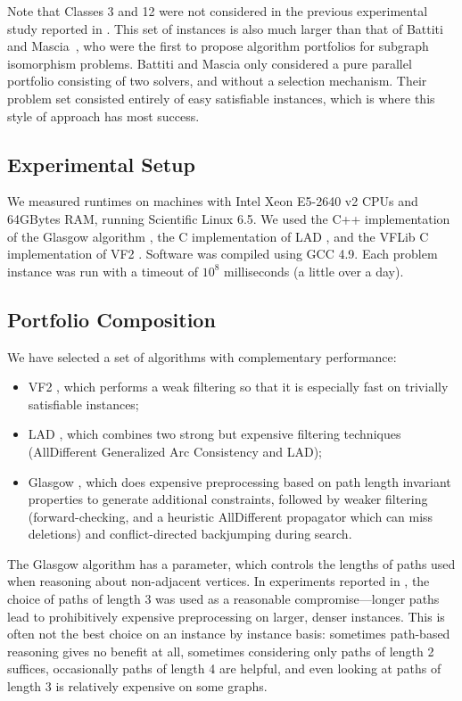 \documentclass{llncs}
\begin{document}
Note that Classes 3 and 12 were not considered in the previous experimental
study reported in \cite{McCreesh:2015}.  This set of instances is also much
larger than that of Battiti and Mascia~\cite{battiti-mascia07}, who were the
first to propose algorithm portfolios for subgraph isomorphism problems.
Battiti and Mascia only considered a pure parallel portfolio consisting of two
solvers, and without a selection mechanism. Their problem set consisted
entirely of easy satisfiable instances, which is where this style of approach
has most success.

\subsection{Experimental Setup}

We measured runtimes on machines with Intel Xeon E5-2640 v2 CPUs and 64GBytes RAM, running
Scientific Linux 6.5. We used the C++ implementation of the Glasgow algorithm \cite{McCreesh:2015},
the C implementation of LAD \cite{Solnon:2010}, and the VFLib C implementation of VF2
\cite{Cordella:2004}. Software was compiled using GCC 4.9. Each problem instance was run with a
timeout of $10^8$ milliseconds (a little over a day).

\subsection{Portfolio Composition}

We have selected a set of algorithms with complementary performance:
\begin{itemize}
\item VF2 \cite{Cordella:2004}, which performs a weak filtering so that it is especially fast on trivially satisfiable instances;
\item LAD \cite{Solnon:2010}, which combines two strong but expensive filtering techniques (AllDifferent Generalized Arc Consistency and LAD);
\item Glasgow \cite{McCreesh:2015}, which does expensive preprocessing based on path length
    invariant properties to generate additional constraints, followed by weaker filtering
    (forward-checking, and a heuristic AllDifferent propagator which can miss deletions) and
    conflict-directed backjumping during search.
\end{itemize}

\noindent The Glasgow algorithm has a parameter, which controls the lengths of paths used when
reasoning about non-adjacent vertices.  In experiments reported in \cite{McCreesh:2015}, the choice
of paths of length 3 was used as a reasonable compromise---longer paths lead to prohibitively
expensive preprocessing on larger, denser instances. This is often not the best choice on an
instance by instance basis: sometimes path-based reasoning gives no benefit at all, sometimes
considering only paths of length 2 suffices, occasionally paths of length 4 are helpful, and even
looking at paths of length 3 is relatively expensive on some graphs.
\end{document}

